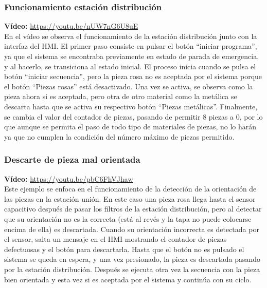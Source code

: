 \clearpage



\subsubsection{Funcionamiento estación distribución}

\textbf{Vídeo:} \url{https://youtu.be/nUW7nG6U8uE} \\

En el vídeo se observa el funcionamiento de la estación distribución junto con la interfaz del HMI. El primer paso consiste en pulsar el botón “iniciar programa”, ya que el sistema se encontraba previamente en estado de parada de emergencia, y al hacerlo, se transiciona al estado inicial. El proceso inicia cuando se pulsa el botón ``iniciar secuencia'', pero la pieza rosa no es aceptada por el sistema porque el botón ``Piezas rosas'' está desactivado. Una vez se activa, se observa como la pieza ahora si es aceptada, pero otra de otro material como la metálica se descarta hasta que se activa su respectivo botón ``Piezas metálicas''. Finalmente, se cambia el valor del contador de piezas, pasando de permitir 8 piezas a 0, por lo que aunque se permita el paso de todo tipo de materiales de piezas, no lo harán ya que no cumplen la condición del número máximo de piezas permitido. \\

\subsubsection{Descarte de pieza mal orientada}

\textbf{Vídeo:} \url{https://youtu.be/pbC6FhVJhaw} \\

Este ejemplo se enfoca en el funcionamiento de la detección de la orientación de las piezas en la estación unión. En este caso una pieza rosa llega hasta el sensor capacitivo después de pasar los filtros de la estación distribución, pero al detectar que su orientación no es la correcta (está al revés y la tapa no puede colocarse encima de ella) es descartada. Cuando su orientación incorrecta es detectada por el sensor, salta un mensaje en el HMI mostrando el contador de piezas defectuosas y el botón para descartarla. Hasta que el botón no es pulsado el sistema se queda en espera, y una vez presionado, la pieza es descartada pasando por la estación distribución. Después se ejecuta otra vez la secuencia con la pieza bien orientada y esta vez si es aceptada por el sistema y continúa con su ciclo. 

